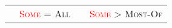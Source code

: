 \documentclass[output=paper]{langscibook}
\begin{document}
\begin{table}
\begin{tabularx}{\textwidth}{X@{}X@{}X@{}X}
 &
 {\footnotesize\textsc{\textcolor{red}{Some}}\textcolor{red}{} = \textsc{\textcolor[rgb]{0.2901961,0.5254902,0.9098039}{All}}}&&
 {\footnotesize\textsc{\textcolor{red}{Some}}\textcolor{red}{ } {\textgreater} \textsc{\textcolor[rgb]{0.41568628,0.65882355,0.30980393}{Most-Of}}}\\

\end{tabularx}
\end{table}
\end{document}
